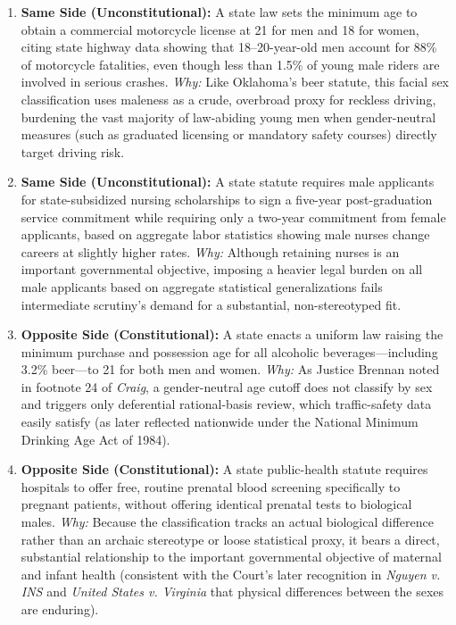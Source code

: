 \documentclass[12pt]{article}
\begin{document}
\begin{enumerate}
  \item \textbf{Same Side (Unconstitutional):} A state law sets the minimum age to obtain a commercial motorcycle license at 21 for men and 18 for women, citing state highway data showing that 18--20-year-old men account for 88\% of motorcycle fatalities, even though less than 1.5\% of young male riders are involved in serious crashes. \textit{Why:} Like Oklahoma's beer statute, this facial sex classification uses maleness as a crude, overbroad proxy for reckless driving, burdening the vast majority of law-abiding young men when gender-neutral measures (such as graduated licensing or mandatory safety courses) directly target driving risk.
  \item \textbf{Same Side (Unconstitutional):} A state statute requires male applicants for state-subsidized nursing scholarships to sign a five-year post-graduation service commitment while requiring only a two-year commitment from female applicants, based on aggregate labor statistics showing male nurses change careers at slightly higher rates. \textit{Why:} Although retaining nurses is an important governmental objective, imposing a heavier legal burden on all male applicants based on aggregate statistical generalizations fails intermediate scrutiny's demand for a substantial, non-stereotyped fit.
  \item \textbf{Opposite Side (Constitutional):} A state enacts a uniform law raising the minimum purchase and possession age for all alcoholic beverages---including 3.2\% beer---to 21 for both men and women. \textit{Why:} As Justice Brennan noted in footnote 24 of \textit{Craig}, a gender-neutral age cutoff does not classify by sex and triggers only deferential rational-basis review, which traffic-safety data easily satisfy (as later reflected nationwide under the National Minimum Drinking Age Act of 1984).
  \item \textbf{Opposite Side (Constitutional):} A state public-health statute requires hospitals to offer free, routine prenatal blood screening specifically to pregnant patients, without offering identical prenatal tests to biological males. \textit{Why:} Because the classification tracks an actual biological difference rather than an archaic stereotype or loose statistical proxy, it bears a direct, substantial relationship to the important governmental objective of maternal and infant health (consistent with the Court's later recognition in \textit{Nguyen v. INS} and \textit{United States v. Virginia} that physical differences between the sexes are enduring).

\end{enumerate}
\end{document}
